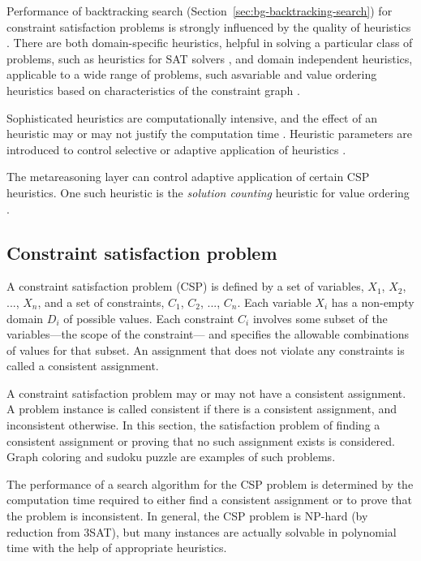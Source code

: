 Performance of backtracking search
(Section~\ref{sec:bg-backtracking-search}) for constraint satisfaction
problems is strongly influenced by the quality of heuristics
\cite{Tsang.csp}. There are both domain-specific heuristics, helpful
in solving a particular class of problems, such as heuristics for SAT
solvers \cite{Krautz.sat}, and domain independent heuristics,
applicable to a wide range of problems, such asvariable and value
ordering heuristics based on characteristics of the constraint graph
\cite{Tsang.csp}.

Sophisticated heuristics are computationally intensive, and the effect
of an heuristic may or may not justify the computation time
\cite{Refalo.impact}. Heuristic parameters are introduced to control
selective or adaptive application of heuristics
\cite{Wallace.macheur}.

The metareasoning layer can control adaptive application
of certain CSP heuristics. One such heuristic is the {\em solution counting}
heuristic for value ordering \cite{Kask.solcount}. 

\subsection{Constraint satisfaction problem}

A constraint satisfaction problem (CSP) is defined by a set
of variables, $X_1$, $X_2$, ..., $X_n$, and a set of constraints,
$C_1$, $C_2$, ..., $C_n$. Each variable $X_i$ has a non-empty domain
$D_i$ of possible values. Each constraint $C_i$ involves some subset
of the variables---the scope of the constraint--- and specifies the
allowable combinations of values for that subset. An assignment that
does not violate any constraints is called a consistent assignment.

A constraint satisfaction problem may or may not have a consistent
assignment. A problem instance is called consistent if there is a
consistent assignment, and inconsistent otherwise. In this section,
the satisfaction problem of finding a consistent assignment or proving
that no such assignment exists is considered. Graph coloring
and sudoku puzzle are examples of such problems.

The performance of a search algorithm for the CSP problem is
determined by the computation time required to either find a
consistent assignment or to prove that the problem is inconsistent. In
general, the CSP problem is NP-hard (by reduction from 3SAT), but many
instances are actually solvable in polynomial time with the help of
appropriate heuristics.

